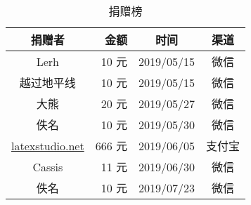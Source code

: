 \begin{table}[!htbp]
  \centering
  \caption{捐赠榜}
    \begin{tabular}{crcc}
    \toprule
    捐赠者   & 金额 & 时间 & 渠道 \\
    \midrule
    Lerh  & 10 元  & 2019/05/15 & 微信 \\
    越过地平线 & 10 元    & 2019/05/15 & 微信 \\
	大熊 &  20 元 & 2019/05/27 & 微信 \\
	佚名 & 10 元 & 2019/05/30 & 微信\\
	\href{http://www.latexstudio.net/}{latexstudio.net} & 666 元 & 2019/06/05 & 支付宝\\
	Cassis & 11 元 & 2019/06/30 & 微信\\
	佚名 & 10 元 & 2019/07/23 & 微信\\
    \bottomrule
    \end{tabular}%
\end{table}%